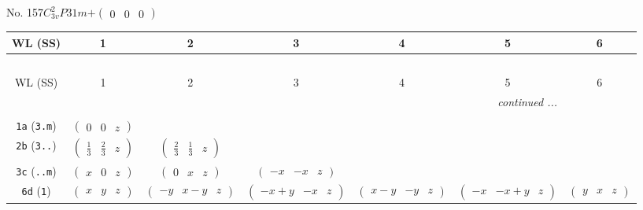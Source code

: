 \documentclass[fleqn,9pt,landscape]{jsarticle}
\begin{document}
\newpage
No. 157\quad$C_{3v}^{2}$\quad$P31m$\quad[ trigonal ]\quad$+\begin{pmatrix} 0 & 0 & 0 \end{pmatrix}$
\begin{center}
\renewcommand{\arraystretch}{1.2}
\begin{longtable}{ccccccc}
 \hline \hline
WL (SS) & 1 & 2 & 3 & 4 & 5 & 6 \\ \hline \endfirsthead

\multicolumn{6}{l}{\tablename\ \thetable{}} \\
 \hline \hline
WL (SS) & 1 & 2 & 3 & 4 & 5 & 6 \\ \hline \endhead

 \hline \hline
\multicolumn{6}{r}{\footnotesize\it continued ...} \\ \endfoot

 \hline \hline
\multicolumn{6}{r}{} \\ \endlastfoot

{\tt 1a} ({\tt 3.m}) & $ \begin{pmatrix} 0 & 0 & z \end{pmatrix} $ & $  $ & $  $ & $  $ & $  $ & $  $ \\ \hline
{\tt 2b} ({\tt 3..}) & $ \begin{pmatrix} \frac{1}{3} & \frac{2}{3} & z \end{pmatrix} $ & $ \begin{pmatrix} \frac{2}{3} & \frac{1}{3} & z \end{pmatrix} $ & $  $ & $  $ & $  $ & $  $ \\ \hline
{\tt 3c} ({\tt ..m}) & $ \begin{pmatrix} x & 0 & z \end{pmatrix} $ & $ \begin{pmatrix} 0 & x & z \end{pmatrix} $ & $ \begin{pmatrix} - x & - x & z \end{pmatrix} $ & $  $ & $  $ & $  $ \\ \hline
{\tt 6d} ({\tt 1}) & $ \begin{pmatrix} x & y & z \end{pmatrix} $ & $ \begin{pmatrix} - y & x - y & z \end{pmatrix} $ & $ \begin{pmatrix} - x + y & - x & z \end{pmatrix} $ & $ \begin{pmatrix} x - y & - y & z \end{pmatrix} $ & $ \begin{pmatrix} - x & - x + y & z \end{pmatrix} $ & $ \begin{pmatrix} y & x & z \end{pmatrix} $ \\
\end{longtable}
\end{center}
\end{document}
